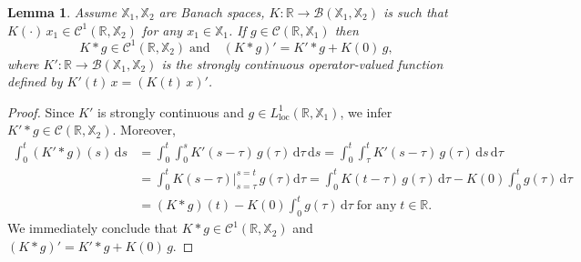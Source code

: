 \documentclass[11pt]{amsart}
\numberwithin{equation}{section}
\newcommand{\rmd}{{\mathrm{d}}}
\newtheorem{lemma}[theorem]{Lemma}
\theoremstyle{remark}
\theoremstyle{definition}
\newcommand\bX{{\mathbb X}}
\begin{document}
\begin{lemma}\label{App3}
	Assume $\bX_1, \bX_2$ are Banach spaces, $K: \mathbb{R} \to \mathcal{B}(\bX_1, \bX_2)$ is such that $K(\cdot)\,x_1 \in \mathcal{C}^1(\mathbb{R}, \bX_2)$ for any $x_1 \in \bX_1$. If $g \in \mathcal{C}(\mathbb{R}, \bX_1)$ then
	\begin{equation}\label{K-conv}
		K * g \in \mathcal{C}^1(\mathbb{R}, \bX_2) \;\text{and} \quad (K * g)' = K' * g + K(0)\,g,
	\end{equation}
	where  $K': \mathbb{R} \to \mathcal{B}(\bX_1, \bX_2)$ is the strongly continuous operator-valued function defined by $K'(t)\,x = (K(t)\,x)'$.	
\end{lemma}	
\begin{proof}
	Since $K'$ is strongly continuous and $g \in L^1_{\mathrm{loc}}(\mathbb{R}, \bX_1)$, \cite[Proposition 1.3.4]{ABHN} we infer $K' * g \in \mathcal{C}(\mathbb{R}, \bX_2)$. Moreover,
	\begin{align*}
		\int_0^t (K' * g)(s)\,\rmd s
		&= \int_0^t \int_0^s K'(s-\tau)\,g(\tau)\,\rmd\tau\,\rmd s = \int_0^t \int_\tau^t K'(s-\tau)\,g(\tau)\,\rmd s\,\rmd\tau\\
		&= \int_0^t K(s-\tau)\Big|_{s=\tau}^{s=t} \,g(\tau)\rmd\tau= \int_0^t K(t-\tau)\,g(\tau)\,\rmd\tau - K(0)\int_0^t g(\tau)\,\rmd\tau \\
		&= (K * g)(t) - K(0)\int_0^t g(\tau)\,\rmd\tau \; \text{for any}\; t \in \mathbb{R}.
	\end{align*}
	We immediately conclude that $K * g \in \mathcal{C}^1(\mathbb{R}, \bX_2)$ and $(K * g)' = K' * g + K(0)\,g$.
\end{proof}
\end{document}
